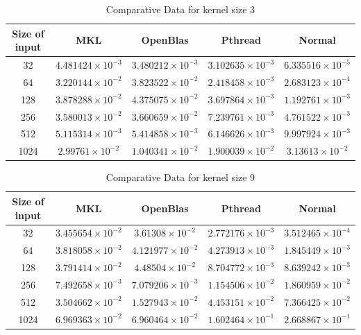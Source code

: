 \documentclass[a4paper]{article}
\begin{document}
\begin{table}[ht]
\caption{Comparative Data for kernel size 3} %
\centering %
\begin{tabular}{c c c c c} %
\hline\hline %
Size of input & MKL & OpenBlas & Pthread & Normal \\ [0.5ex] %
\hline %
32 & $4.481424\times 10^{-3}$ & $3.480212\times 10^{-3}$ & $3.102635\times 10^{-3}$ & $6.335516\times 10^{-5}$  \\
64 & $3.220144\times 10^{-2}$ & $3.823522\times 10^{-2}$ & $2.418458\times 10^{-3}$ & $2.683123\times 10^{-4}$  \\
128 & $3.878288\times 10^{-2}$ & $4.375075\times 10^{-2}$ & $3.697864\times 10^{-3}$ & $1.192761\times 10^{-3}$  \\
256 & $3.580013\times 10^{-2}$ & $3.660659\times 10^{-2}$ & $7.239761\times 10^{-3}$ & $4.761522\times 10^{-3}$  \\
512 & $5.115314\times 10^{-3}$ & $5.414858\times 10^{-3}$ & $6.146626\times 10^{-3}$ & $9.997924\times 10^{-3}$  \\
1024 & $2.99761\times 10^{-2}$ & $1.040341\times 10^{-2}$ & $1.900039\times 10^{-2}$ & $3.13613\times 10^{-2}$  \\[1ex] %
\hline %
\end{tabular}
\label{table:nonlin} %
\end{table} 


\begin{table}[ht]
\caption{Comparative Data for kernel size 9} %
\centering %
\begin{tabular}{c c c c c} %
\hline\hline %
Size of input & MKL & OpenBlas & Pthread & Normal \\ [0.5ex] %
\hline %
32 & $3.455654\times 10^{-2}$ & $3.61308\times 10^{-2}$ & $2.772176\times 10^{-3}$ & $3.512465\times 10^{-4}$  \\
64 & $3.818058\times 10^{-2}$ & $4.121977\times 10^{-2}$ & $4.273913\times 10^{-3}$ & $1.845449\times 10^{-3}$  \\
128 & $3.791414\times 10^{-2}$ & $4.48504\times 10^{-2}$ & $8.704772\times 10^{-3}$ & $8.639242\times 10^{-3}$  \\
256 & $7.492658\times 10^{-3}$ & $7.079206\times 10^{-3}$ & $1.154506\times 10^{-2}$ & $1.860959\times 10^{-2}$  \\
512 & $3.504662\times 10^{-2}$ & $1.527943\times 10^{-2}$ & $4.453151\times 10^{-2}$ & $7.366425\times 10^{-2}$  \\
1024 & $6.969363\times 10^{-2}$ & $6.960464\times 10^{-2}$ & $1.602464\times 10^{-1}$ & $2.668867\times 10^{-1}$  \\[1ex] %
\hline %
\end{tabular}
\label{table:nonn} %
\end{table} 
\end{document}
